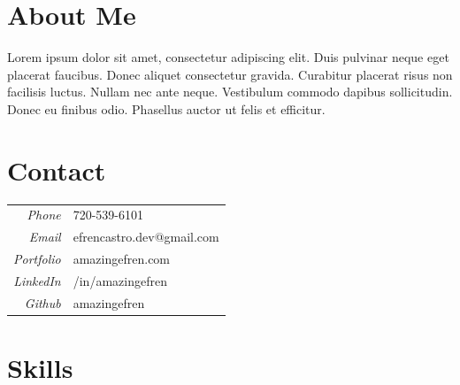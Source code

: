 \documentclass[11pt,oneside,a4paper,titlepage]{article}
\begin{document}
\begin{tcolorbox}
  \begin{minipage}[t]{9cm}
    \vspace*{-0.5cm}
    \begin{tcolorbox}[grow to left by=0.55cm,colback=themeBorder,colframe=white,arc=0mm,]
      \section*{About Me}
        Lorem ipsum dolor sit amet, consectetur adipiscing elit. Duis pulvinar neque eget placerat faucibus. Donec aliquet consectetur gravida. Curabitur placerat risus non facilisis luctus. Nullam nec ante neque. Vestibulum commodo dapibus sollicitudin. Donec eu finibus odio. Phasellus auctor ut felis et efficitur.
      \section*{Contact}
      \begin{tabular}{r l}
        \emph{Phone}      & 720-539-6101\\
        \emph{Email}      & efrencastro.dev@gmail.com\\
        \emph{Portfolio}  & amazingefren.com\\
        \emph{LinkedIn}   & /in/amazingefren\\
        \emph{Github}     & amazingefren
      \end{tabular}

      \section*{Skills}


\end{tcolorbox}
\end{minipage}
\end{tcolorbox}
\end{document}
